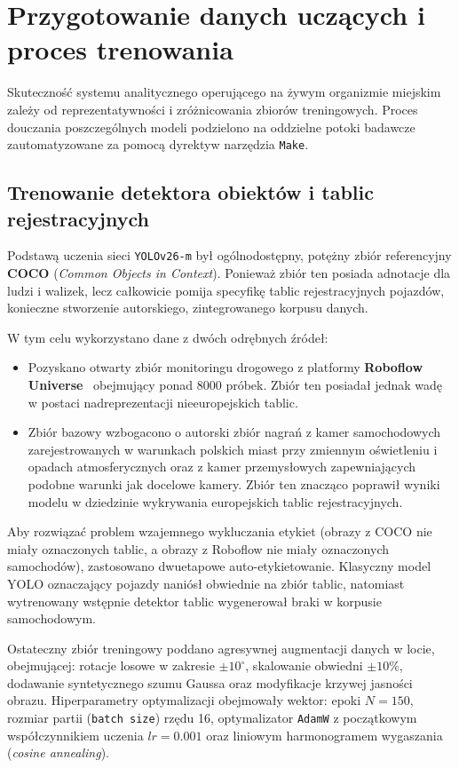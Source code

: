 \section{Przygotowanie danych uczących i proces trenowania}\label{sec:detektor_trenowanie}

Skuteczność systemu analitycznego operującego na żywym organizmie miejskim zależy od reprezentatywności i zróżnicowania zbiorów treningowych. Proces douczania poszczególnych modeli podzielono na oddzielne potoki badawcze zautomatyzowane za pomocą dyrektyw narzędzia \texttt{Make}.

\subsection{Trenowanie detektora obiektów i tablic rejestracyjnych}
Podstawą uczenia sieci \texttt{YOLOv26-m} był ogólnodostępny, potężny zbiór referencyjny \textbf{COCO} (\textit{Common Objects in Context}). Ponieważ zbiór ten posiada adnotacje dla ludzi i walizek, lecz całkowicie pomija specyfikę tablic rejestracyjnych pojazdów, konieczne stworzenie autorskiego, zintegrowanego korpusu danych.

W tym celu wykorzystano dane z dwóch odrębnych źródeł:
\begin{itemize}
    \item Pozyskano otwarty zbiór monitoringu drogowego z platformy \textbf{Roboflow Universe}~\cite{license-plate-recognition-rxg4e_dataset} obejmujący ponad 8000 próbek. Zbiór ten posiadał jednak wadę w postaci nadreprezentacji nieeuropejskich tablic.
    \item Zbiór bazowy wzbogacono o autorski zbiór nagrań z kamer samochodowych zarejestrowanych w warunkach polskich miast przy zmiennym oświetleniu i opadach atmosferycznych oraz z kamer przemysłowych zapewniających podobne warunki jak docelowe kamery. Zbiór ten znacząco poprawił wyniki modelu w dziedzinie wykrywania europejskich tablic rejestracyjnych.
\end{itemize}

Aby rozwiązać problem wzajemnego wykluczania etykiet (obrazy z COCO nie miały oznaczonych tablic, a obrazy z Roboflow nie miały oznaczonych samochodów), zastosowano dwuetapowe auto-etykietowanie. Klasyczny model YOLO oznaczający pojazdy naniósł obwiednie na zbiór tablic, natomiast wytrenowany wstępnie detektor tablic wygenerował braki w korpusie samochodowym. 

Ostateczny zbiór treningowy poddano agresywnej augmentacji danych w locie, obejmującej: rotacje losowe w zakresie $\pm 10^\circ$, skalowanie obwiedni $\pm 10\%$, dodawanie syntetycznego szumu Gaussa oraz modyfikacje krzywej jasności obrazu. Hiperparametry optymalizacji obejmowały wektor: epoki $N=150$, rozmiar partii (\texttt{batch size}) rzędu 16, optymalizator \texttt{AdamW} z początkowym współczynnikiem uczenia $lr=0.001$ oraz liniowym harmonogramem wygaszania (\textit{cosine annealing}).

